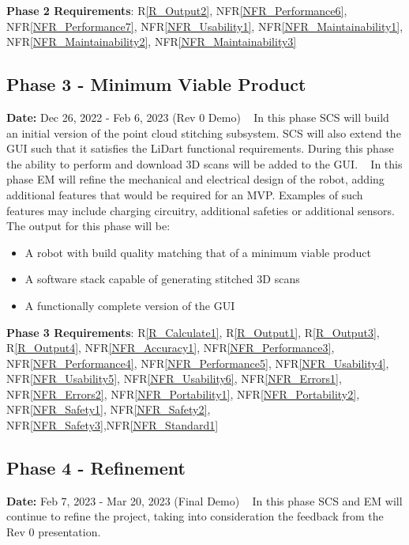 \documentclass[12pt]{article}
\newcommand{\rref}[1]{R\ref{#1}}
\newcommand{\nfrref}[1]{NFR\ref{#1}}
\begin{document}
\noindent \textbf{Phase 2 Requirements}: \rref{R_Output2}, \nfrref{NFR_Performance6}, \nfrref{NFR_Performance7}, \nfrref{NFR_Usability1}, \nfrref{NFR_Maintainability1}, \nfrref{NFR_Maintainability2}, \nfrref{NFR_Maintainability3}

\subsection{Phase 3 - Minimum Viable Product}
\textbf{Date:} Dec 26, 2022 - Feb 6, 2023 (Rev 0 Demo)
\ \newline\newline
In this phase SCS will build an initial version of the point cloud stitching subsystem. SCS
will also extend the GUI such that it satisfies the LiDart functional requirements. During this
phase the ability to perform and download 3D scans will be added to the GUI.
\ \newline\newline
In this phase EM will refine the mechanical and electrical design of the robot, adding additional
features that would be required for an MVP. Examples of such features may include charging circuitry,
additional safeties or additional sensors.
\ \newline\newline
The output for this phase will be:
\begin{itemize}
\item A robot with build quality matching that of a minimum viable product
\item A software stack capable of generating stitched 3D scans
\item A functionally complete version of the GUI
\end{itemize}

\noindent \textbf{Phase 3 Requirements}: \rref{R_Calculate1}, \rref{R_Output1}, \rref{R_Output3}, \rref{R_Output4}, \nfrref{NFR_Accuracy1}, \nfrref{NFR_Performance3}, \nfrref{NFR_Performance4}, \nfrref{NFR_Performance5}, \nfrref{NFR_Usability4}, \nfrref{NFR_Usability5}, \nfrref{NFR_Usability6}, \nfrref{NFR_Errors1}, \nfrref{NFR_Errors2}, \nfrref{NFR_Portability1}, \nfrref{NFR_Portability2}, \nfrref{NFR_Safety1}, \nfrref{NFR_Safety2}, \nfrref{NFR_Safety3},\nfrref{NFR_Standard1}

\subsection{Phase 4 - Refinement}
\textbf{Date:} Feb 7, 2023 - Mar 20, 2023 (Final Demo)
\ \newline\newline
In this phase SCS and EM will continue to refine the project, taking into consideration the feedback from the Rev 0 presentation.\\
\end{document}
